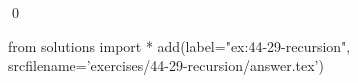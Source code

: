 
\begin{ex}
  \label{ex:44-29-recursion}
  
  \qed
\end{ex}
\begin{python0}
from solutions import *
add(label="ex:44-29-recursion",
    srcfilename='exercises/44-29-recursion/answer.tex')
\end{python0}
